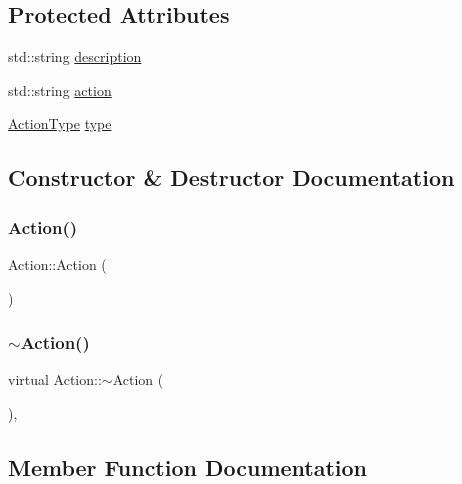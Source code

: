 \subsection*{Protected Attributes}
\begin{DoxyCompactItemize}
\item 
std\+::string \mbox{\hyperlink{class_action_a279273192c7d6d5f13796919bc2a79e3}{description}}
\item 
std\+::string \mbox{\hyperlink{class_action_a9d08b02c278c2d1835b25f922143328d}{action}}
\item 
\mbox{\hyperlink{_action_8h_a21d5e8f8cdaa838586b31007df0a950b}{Action\+Type}} \mbox{\hyperlink{class_action_a9171771045247ad4471b371ced19e959}{type}}
\end{DoxyCompactItemize}


\subsection{Constructor \& Destructor Documentation}
\mbox{\label{class_action_a4f457ccfc8336b565cadca56b36e0271}} 
\subsubsection{\texorpdfstring{Action()}{Action()}}
{\footnotesize\ttfamily Action\+::\+Action (\begin{DoxyParamCaption}{ }\end{DoxyParamCaption})\hspace{0.3cm}{\ttfamily [inline]}}

\mbox{\label{class_action_abcf4c6358f53a666631ace11b325a7cd}} 
\subsubsection{\texorpdfstring{$\sim$\+Action()}{~Action()}}
{\footnotesize\ttfamily virtual Action\+::$\sim$\+Action (\begin{DoxyParamCaption}{ }\end{DoxyParamCaption})\hspace{0.3cm}{\ttfamily [inline]}, {\ttfamily [virtual]}}



\subsection{Member Function Documentation}
\mbox{\label{class_action_a98298a95b5f2cd9212f301cd855ed06d}} 
